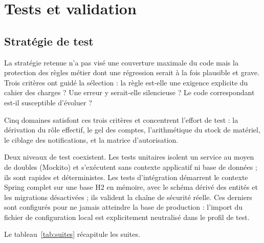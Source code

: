 \chapter{Tests et validation}
\label{ch:tests}

\section{Stratégie de test}

La stratégie retenue n'a pas visé une couverture maximale du code mais la protection des
règles métier dont une régression serait à la fois plausible et grave. Trois critères ont
guidé la sélection : la règle est-elle une exigence explicite du cahier des charges ?
Une erreur y serait-elle silencieuse ? Le code correspondant est-il susceptible d'évoluer ?

Cinq domaines satisfont ces trois critères et concentrent l'effort de test : la dérivation
du rôle effectif, le gel des comptes, l'arithmétique du stock de matériel, le ciblage des
notifications, et la matrice d'autorisation.

Deux niveaux de test coexistent. Les tests unitaires isolent un service au moyen de doubles
(Mockito) et s'exécutent sans contexte applicatif ni base de données ; ils sont rapides et
déterministes. Les tests d'intégration démarrent le contexte Spring complet sur une base
H2 en mémoire, avec le schéma dérivé des entités et les migrations désactivées ; ils
valident la chaîne de sécurité réelle. Ces derniers sont configurés pour ne jamais atteindre
la base de production : l'import du fichier de configuration local est explicitement
neutralisé dans le profil de test.

Le tableau~\ref{tab:suites} récapitule les suites.

